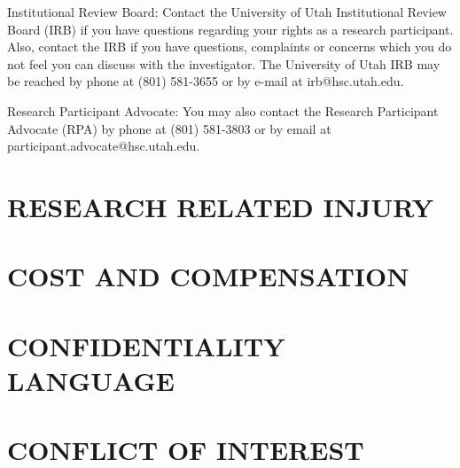 \documentclass[11pt]{article}
\begin{document}
%
{%
{Institutional Review Board: Contact the University of Utah Institutional Review Board (IRB) if you have questions regarding your rights as a research participant. Also, contact the IRB if you have questions, complaints or concerns which you do not feel you can discuss with the investigator. The University of Utah IRB may be reached by phone at (801) 581-3655 or by e-mail at irb@hsc.utah.edu.

Research Participant Advocate: You may also contact the Research Participant Advocate (RPA) by phone at (801) 581-3803 or by email at participant.advocate@hsc.utah.edu. }
}%
{}%

%
{%
\section{RESEARCH RELATED INJURY}
\label{sec:researchrelatedinjury}
{}
}%
{}%

%
{%
\section{COST AND COMPENSATION}
\label{sec:sitecostofcompensation}
{}
}%
{}%

%
{%
\section{CONFIDENTIALITY LANGUAGE}
\label{sec:confidentiality}
{}

{}
}%
{}%

%
{%
\section{CONFLICT OF INTEREST}
\label{sec:conflictofinterest}
{}
}%
{}%
\end{document}

